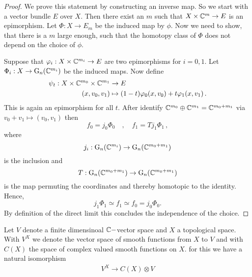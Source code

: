 \begin{proof}
	We prove this statement by constructing an inverse map. So we start with a vector bundle $E$ over $X$. Then there exist an $m$ such that $X\times \mathbb{C}^m \to E$ is an epimorphism. Let $\Phi:X\to E_m$ be the induced map by $\phi$. Now we need to show, that there is a $m$ large enough, such that the homotopy class of $\Phi$ does not depend on the choice of $\phi$.  
	
	Suppose that $\varphi_i:X\times \mathbb{C}^{m_i}\to E$ are two epimorphisms for $i=0,1$. Let $\Phi_i:X\to \mathrm{G}_n(\mathbb{C}^{m_i})$ be the induced maps. Now define 
	\begin{align*}
		\psi_t: X\times \mathbb{C}^{m_0}\times \mathbb{C}^{m_1} & \to E\\
		(x,v_0,v_1)                             & \mapsto (1-t)\varphi_0(x,v_0)+t\varphi_1(x,v_1) \, .
	\end{align*}    
	This is again an epimorphism for all $t$. After identify $\mathbb{C}^{m_0}\oplus \mathbb{C}^{m_1} =\mathbb{C}^{m_0+m_1}$ via $v_0+v_1 \mapsto (v_0,v_1)$ then 
	\begin{equation*}
		f_0 = j_0\Phi_0 \quad,\quad f_1 =T j_1\Phi_1 \, , 
	\end{equation*}where \begin{equation*}
		j_i: \mathrm{G}_n(\mathbb{C}^{m_i})\to \mathrm{G}_n(\mathbb{C}^{m_0+m_1})
	\end{equation*} is the inclusion and 
	\begin{equation*}
		T: \mathrm{G}_n(\mathbb{C}^{m_0+m_1})\to \mathrm{G}_n(\mathbb{C}^{m_0+m_1})
	\end{equation*} is the map permuting the coordinates and thereby homotopic to the identity. Hence, 
	\begin{equation*}
		j_1\Phi_1 \simeq f_1\simeq f_0 =j_0\Phi_0.
	\end{equation*} By definition of the direct limit this concludes the independence of the choice.
\end{proof}
\begin{lemma}
	Let $V$ denote a finite dimensinoal $\mathbb{C}-$vector space and $X$ a topological space. With $V^X$ we denote the vector space of smooth functions from $X$ to $V$ and with $C(X)$ the space of complex valued smooth functions on $X$. for this we have a natural isomorphism
	\begin{align*}
		V^X\to C(X)\otimes V
	\end{align*}
\end{lemma}
